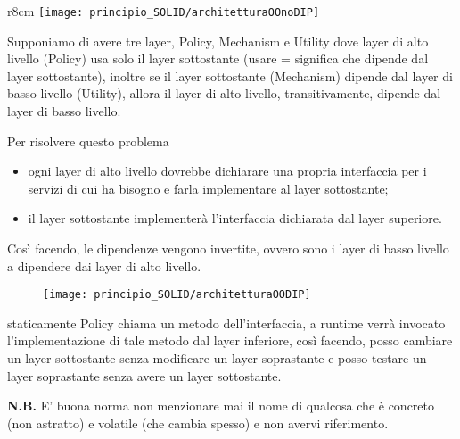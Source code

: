 \begin{wrapfigure}{r}{8cm}
  \texttt{[image: principio\_SOLID/architetturaOOnoDIP]}  
\end{wrapfigure}
Supponiamo di avere tre layer, Policy, Mechanism e Utility dove layer di alto livello (Policy) usa solo il layer sottostante
(usare = significa che dipende dal layer sottostante), inoltre se il layer sottostante (Mechanism) dipende dal layer di basso livello (Utility), allora il layer di alto 
livello, transitivamente, dipende dal layer di basso livello.

Per risolvere questo problema
\begin{itemize}
  \item ogni layer di alto livello dovrebbe dichiarare una propria interfaccia per i servizi di cui ha bisogno e farla implementare al layer sottostante;
  \item il layer sottostante implementerà l'interfaccia dichiarata dal layer superiore.
\end{itemize}

Così facendo, le dipendenze vengono invertite, ovvero sono i layer di basso livello a dipendere dai layer di alto livello.
\begin{figure}[H]
  \centering
  \texttt{[image: principio\_SOLID/architetturaOODIP]}  
\end{figure}

staticamente Policy chiama un metodo dell'interfaccia, a runtime verrà invocato l'implementazione di tale metodo dal layer inferiore, così facendo, posso cambiare un
layer sottostante senza modificare un layer soprastante e posso testare un layer soprastante senza avere un layer sottostante. 
\medskip

\textbf{N.B.} E' buona norma non menzionare mai il nome di qualcosa che è concreto (non astratto) e volatile (che cambia spesso) e non avervi riferimento.